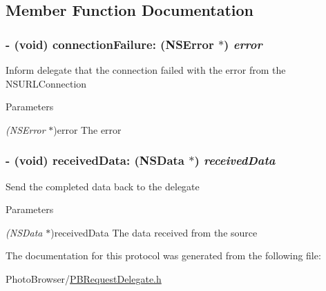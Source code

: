 \subsection{Member Function Documentation}
\hypertarget{protocol_p_b_n_s_u_r_l_connection_delegate_protocol-p_a0b7985884a8aebfbd6cfc1fd176482cd}{
\subsubsection[{connectionFailure:}]{\setlength{\rightskip}{0pt plus 5cm}-\/ (void) connectionFailure: (NSError $\ast$) {\em error}}}
\label{protocol_p_b_n_s_u_r_l_connection_delegate_protocol-p_a0b7985884a8aebfbd6cfc1fd176482cd}
Inform delegate that the connection failed with the error from the NSURLConnection 
\begin{DoxyParams}{Parameters}
\item[{\em (NSError}]$\ast$)error The error \end{DoxyParams}
\hypertarget{protocol_p_b_n_s_u_r_l_connection_delegate_protocol-p_a496dbcef3501cd4547745aeb6a4359b6}{
\subsubsection[{receivedData:}]{\setlength{\rightskip}{0pt plus 5cm}-\/ (void) receivedData: (NSData $\ast$) {\em receivedData}}}
\label{protocol_p_b_n_s_u_r_l_connection_delegate_protocol-p_a496dbcef3501cd4547745aeb6a4359b6}
Send the completed data back to the delegate 
\begin{DoxyParams}{Parameters}
\item[{\em (NSData}]$\ast$)receivedData The data received from the source \end{DoxyParams}


The documentation for this protocol was generated from the following file:\begin{DoxyCompactItemize}
\item 
PhotoBrowser/\hyperlink{_p_b_request_delegate_8h}{PBRequestDelegate.h}\end{DoxyCompactItemize}
